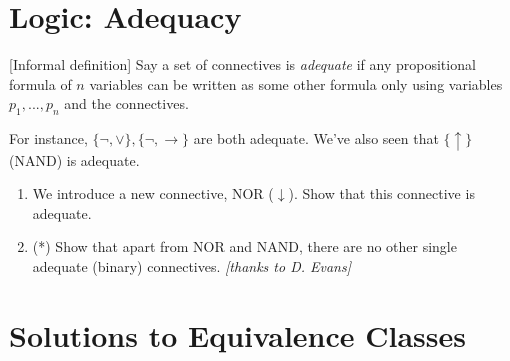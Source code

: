 \documentclass[10pt,a4paper]{article}
\begin{document}
\section{Logic: Adequacy}


[Informal definition]
Say a set of connectives is \emph{adequate} if any propositional formula 
of \(n\) variables can be written as some other formula only using variables 
\(p_1, ... , p_n\) and the connectives.

For instance, \( \{ \neg , \lor \}, \{ \neg, \rightarrow \} \) 
are both adequate.
We've also seen that \( \{ \uparrow \} \) (NAND) is adequate.

\begin{enumerate}
    \item We introduce a new connective, NOR (\( \downarrow \)).
    Show that this connective is adequate.
    \item (*) Show that apart from NOR and NAND, 
    there are no other single adequate (binary) connectives.
    \emph{[thanks to D. Evans]}
\end{enumerate}


\newpage

\section{Solutions to Equivalence Classes}
\end{document}
